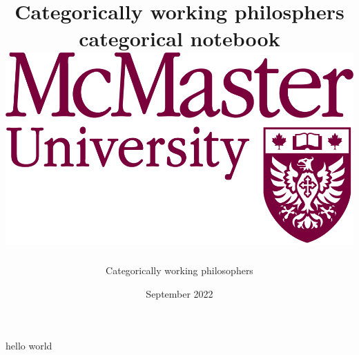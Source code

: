 \documentclass[12pt]{article}
\title{{Categorically working philosphers categorical notebook}\\
{\includegraphics[width=.3\textwidth]{university.jpg}}}
\author{Categorically working philosophers}
\date{September 2022}
\begin{document}
\maketitle

hello world

\printbibliography
\end{document}
